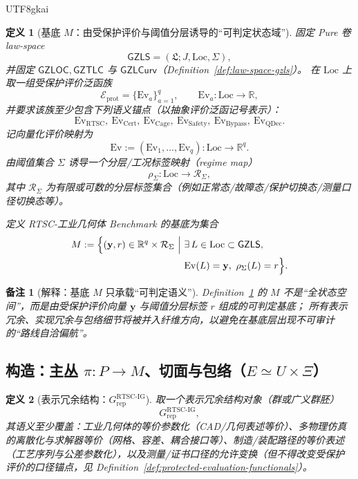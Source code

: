 \documentclass[12pt]{article}
\newtheorem{definition}{定义}[section]
\newtheorem{remark}{备注}[section]
\newcommand{\GZLS}{\ensuremath{\mathsf{GZLS}}}
\newcommand{\GZLOC}{\ensuremath{\mathsf{GZLOC}}}
\newcommand{\GZLCurv}{\ensuremath{\mathsf{GZLCurv}}}
\newcommand{\GZTLC}{\ensuremath{\mathsf{GZTLC}}}
\newcommand{\RTSC}{\textsf{RTSC}}
\begin{document}
\begin{CJK*}{UTF8}{gkai}
\begin{definition}[基底 $M$：由受保护评价与阈值分层诱导的“可判定状态域”]
\label{def:rtsc-ig-benchmark-base}
固定 Pure 卷 law-space
\[
\GZLS=(\mathfrak{L};J,\mathrm{Loc},\Sigma),
\]
并固定 $\GZLOC,\GZTLC$ 与 $\GZLCurv$（Definition~\ref{def:law-space-gzls}）。
在 $\mathrm{Loc}$ 上取一组受保护评价泛函族
\[
\mathcal{E}_{\mathrm{prot}}
=
\{\mathrm{Ev}_a\}_{a=1}^{q},
\qquad
\mathrm{Ev}_a:\mathrm{Loc}\to\mathbb{R},
\]
并要求该族至少包含下列语义锚点（以抽象评价泛函记号表示）：
\[
\mathrm{Ev}_{\mathrm{RTSC}},\ \mathrm{Ev}_{\mathrm{Cert}},\
\mathrm{Ev}_{\mathrm{Cage}},\ \mathrm{Ev}_{\mathrm{Safety}},\
\mathrm{Ev}_{\mathrm{Bypass}},\
\mathrm{Ev}_{\mathrm{QDec}}.
\]
记向量化评价映射为
\[
\mathrm{Ev}:=(\mathrm{Ev}_1,\dots,\mathrm{Ev}_q):\mathrm{Loc}\to\mathbb{R}^q.
\]
由阈值集合 $\Sigma$ 诱导一个分层/工况标签映射（regime map）
\[
\rho_{\Sigma}:\mathrm{Loc}\to \mathcal{R}_{\Sigma},
\]
其中 $\mathcal{R}_{\Sigma}$ 为有限或可数的分层标签集合（例如正常态/故障态/保护切换态/测量口径切换态等）。

定义 \RTSC{}-工业几何体 Benchmark 的基底为集合
\[
\begin{aligned}
M
:=
\Bigl\{
(\mathbf{y},r)\in \mathbb{R}^q\times \mathcal{R}_{\Sigma}\ \Big|\
&\exists\,L\in \mathrm{Loc}\subset\GZLS,\\
&\mathrm{Ev}(L)=\mathbf{y},\ \rho_{\Sigma}(L)=r
\Bigr\}.
\end{aligned}
\]
\end{definition}

\begin{remark}[解释：基底 $M$ 只承载“可判定语义”]
Definition~\ref{def:rtsc-ig-benchmark-base} 的 $M$ 不是“全状态空间”，而是由受保护评价向量 $\mathbf{y}$ 与阈值分层标签 $r$ 组成的可判定基底；
所有表示冗余、实现冗余与包络细节将被并入纤维方向，以避免在基底层出现不可审计的“路线自洽偏航”。
\end{remark}

\subsection{构造：主丛 $\pi:P\to M$、切面与包络（$E\simeq U\times\Xi$）}

\begin{definition}[表示冗余结构：$G_{\mathrm{rep}}^{\mathrm{RTSC\text{-}IG}}$]
\label{def:rtsc-ig-grep}
取一个表示冗余结构对象（群或广义群胚）
\[
G_{\mathrm{rep}}^{\mathrm{RTSC\text{-}IG}},
\]
其语义至少覆盖：工业几何体的等价参数化（CAD/几何表述等价）、多物理仿真的离散化与求解器等价（网格、容差、耦合接口等）、制造/装配路径的等价表述（工艺序列与公差参数化），以及测量/证书口径的允许变换（但不得改变受保护评价的口径锚点，见
  Definition~\ref{def:protected-evaluation-functionals}）。
\end{definition}


\end{CJK*}
\end{document}
